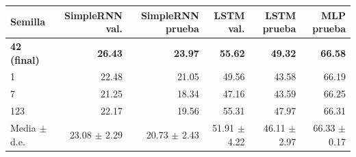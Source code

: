 \begin{tabular}{lrrrrr}
\toprule
Semilla & SimpleRNN val. & SimpleRNN prueba & LSTM val. & LSTM prueba & MLP prueba \\
\midrule
\textbf{42 (final)} & \textbf{26.43} & \textbf{23.97} & \textbf{55.62} & \textbf{49.32} & \textbf{66.58} \\
1 & 22.48 & 21.05 & 49.56 & 43.58 & 66.19 \\
7 & 21.25 & 18.34 & 47.16 & 43.59 & 66.25 \\
123 & 22.17 & 19.56 & 55.31 & 47.97 & 66.31 \\
Media $\pm$ d.e. & 23.08 $\pm$ 2.29 & 20.73 $\pm$ 2.43 & 51.91 $\pm$ 4.22 & 46.11 $\pm$ 2.97 & 66.33 $\pm$ 0.17 \\
\bottomrule
\end{tabular}
